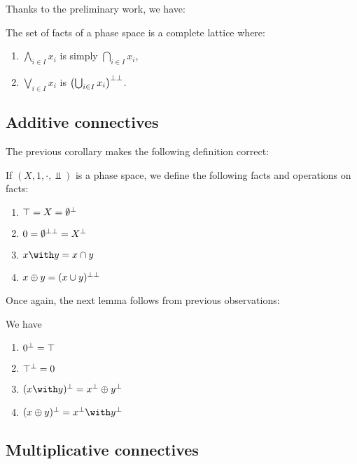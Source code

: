 Thanks to the preliminary work, we have:

\begin{corollary}
The set of facts of a phase space is a complete lattice where:
\begin{enumerate}
\item $\bigwedge_{i\in I} x_i$ is simply $\bigcap_{i\in I} x_i$,
\item $\bigvee_{i\in I} x_i$ is $\left(\bigcup_{i\in I} x_i\right)^{\bot\bot}$.
\end{enumerate}
\end{corollary}

\subsection{Additive connectives}\label{additive-connectives}

The previous corollary makes the following definition correct:

\begin{definition}
If $(X,1,\cdot,\Bot)$ is a phase space, we define the following facts and operations on facts:
\begin{enumerate}
\item $\top = X = \emptyset^\bot$
\item $0 = \emptyset^{\bot\bot} = X^\bot$
\item $x\with y = x\cap y$
\item $x\oplus y = (x\cup y)^{\bot\bot}$
\end{enumerate}
\end{definition}

Once again, the next lemma follows from previous observations:

\begin{lemma}
We have
\begin{enumerate}
\item $0^\bot = \top$
\item $\top^\bot = 0$
\item $(x\with y)\orth = x\orth \plus y\orth$
\item $(x\plus y)\orth = x\orth \with y\orth$
\end{enumerate}
\end{lemma}

\subsection{Multiplicative connectives}\label{multiplicative-connectives}

